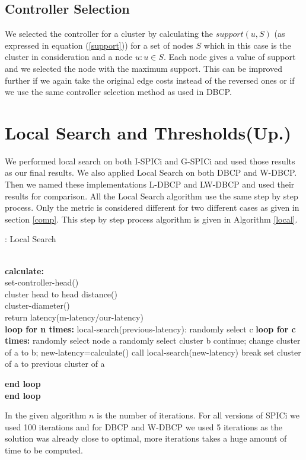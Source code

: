 \documentclass[10pt]{extarticle}
\begin{document}
	\subsection{Controller Selection}
	We selected the controller for a cluster by calculating the $support(u,S)$ (as expressed in equation (\ref{support})) for a set of nodes $S$ which in this case is the cluster in consideration and a node $u:u\in S$. Each node gives a value of support and we selected the node with the maximum support. This can be improved further if we again take the original edge costs instead of the reversed ones or if we use the same controller selection method as used in DBCP.
	
	\section{Local Search and Thresholds(Up.)}
	We performed local search on both I-SPICi and G-SPICi and used those results as our final results. We also applied Local Search on both DBCP and W-DBCP. Then we named these implementations L-DBCP and LW-DBCP and used their results for comparison. All the Local Search algorithm use the same step by step process. Only the metric is considered different for two different cases as given in section \ref{comp}. This step by step process algorithm is given in Algorithm \ref{local}.
	
	\begin{algorithm}
		\caption{: Local Search}\label{local}
		\begin{algorithmic}[1]
			 \\
			\textbf{calculate:} \\
			set-controller-head() \\
			cluster head to head distance() \\
			cluster-diameter() \\
			return latency(m-latency/our-latency) \\
			
			\textbf{loop for n times:}
			\State local-search(previous-latency):
			\State randomly select c
			\State \textbf{loop for c times:}
			\State randomly select node a
			\State randomly select cluster b
			 continue;
			\EndIf
			\State change cluster of a to b;
			\State new-latency=calculate()
			\State call local-search(new-latency)
			\State break
			\Else
			\State set cluster of a to previous cluster of a
			
			\EndIf
			\State \textbf{end loop} \\
			\textbf{end loop}
			\EndProcedure
		\end{algorithmic}
	\end{algorithm}
	In the given algorithm $n$ is the number of iterations. For all versions of SPICi we used 100 iterations and for DBCP and W-DBCP we used 5 iterations as the solution was already close to optimal, more iterations takes a huge amount of time to be computed.
	
\end{document}
